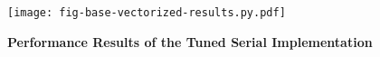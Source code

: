 
\begin{figure}[h]
    \centering
    \texttt{[image: fig-base-vectorized-results.py.pdf]}
  \caption{\textbf{Performance Results of the Tuned Serial Implementation}}
  \label{fig-base-vectorized-results}

\end{figure}

